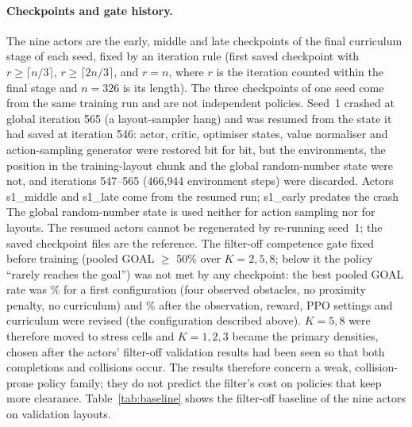 \documentclass[journal]{IEEEtran}
\begin{document}
\paragraph{Checkpoints and gate history.} The nine actors are the early, middle and late checkpoints
of the final curriculum stage of each seed, fixed by an iteration rule (first saved checkpoint with
$r\ge\lceil n/3\rceil$, $r\ge\lceil 2n/3\rceil$, and $r=n$, where $r$ is the iteration counted within the
final stage and $n=326$ is its length). The three checkpoints of one seed come from the same training
run and are not independent policies.
Seed~1 crashed at global iteration 565 (a layout-sampler hang) and was resumed from the state it had
saved at iteration 546: actor, critic, optimiser states, value normaliser and action-sampling
generator were restored bit for bit, but the environments, the position in the training-layout chunk
and the global random-number state were not, and iterations 547--565 (466{,}944 environment steps) were
discarded. Actors s1\_middle and s1\_late come from the resumed run; s1\_early predates the crash
The global random-number state is used neither for action sampling nor for layouts. The resumed
actors cannot be regenerated by re-running seed~1; the saved checkpoint files are the reference. The
filter-off competence gate fixed before training (pooled GOAL $\ge$ 50\% over $K=2,5,8$; below it the
policy ``rarely reaches the goal'') was not met by any checkpoint: the best pooled GOAL rate was
\GateVoneBest\% for a first configuration (four observed obstacles, no proximity penalty, no
curriculum) and \GateVtwoBest\% after the observation, reward, PPO settings and curriculum were revised
(the configuration described above). $K=5,8$ were therefore moved to stress cells and $K=1,2,3$ became
the primary densities, chosen after the actors' filter-off validation results had been seen so that both
completions and collisions occur. The results therefore concern a weak, collision-prone policy family;
they do not predict the filter's cost on policies that keep more clearance.
Table~\ref{tab:baseline} shows the filter-off baseline of the nine actors on validation layouts.

\begin{table}[t]
\centering\small
\caption{Filter-off baseline on validation layouts (200 per cell): GOAL / COLLISION / TIMEOUT (\%) per actor and
obstacle count $K$ (descriptive context; $K=4$ was an intermediate diagnostic).}
\label{tab:baseline}
\end{table}
\end{document}
